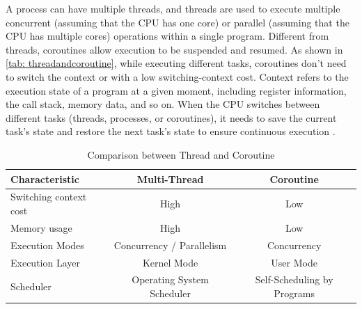\documentclass[
	english,
	ruledheaders=section,%
	class=report,%
	thesis={type=Report},%
	accentcolor=9c,%
	custommargins=true,%
	marginpar=false,%
	parskip=half-,%
	fontsize=11pt,%
	logofile={img/tuda_logo.pdf}, %
]{tudapub}
\begin{document}
A process can have multiple threads, and threads are used to execute multiple concurrent (assuming that the CPU has one core) or parallel (assuming that the CPU has multiple cores) operations within a single program. Different from threads, coroutines allow execution to be suspended and resumed. As shown in \autoref{tab: threadandcoroutine}, while executing different tasks, coroutines don't need to switch the context or with a low switching-context cost. Context refers to the execution state of a program at a given moment, including register information, the call stack, memory data, and so on. When the CPU switches between different tasks (threads, processes, or coroutines), it needs to save the current task's state and restore the next task's state to ensure continuous execution \cite{coroutinetutorial}.

\begin{table}[htbp]  
  \centering        
  \begin{tabular}{|l|c|c|}
    \hline
    \textbf{Characteristic} & \textbf{Multi-Thread} & \textbf{Coroutine}\\
    \hline
    Switching context cost & High & Low\\
    \hline
    Memory usage & High & Low\\
    \hline
    Execution Modes & Concurrency / Parallelism & Concurrency\\
    \hline
    Execution Layer & Kernel Mode & User Mode\\
    \hline
    Scheduler & Operating System Scheduler & Self-Scheduling by Programs\\
    \hline
  \end{tabular}
  \caption{Comparison between Thread and Coroutine}
  \label{tab: threadandcoroutine}
\end{table}


\end{document}
